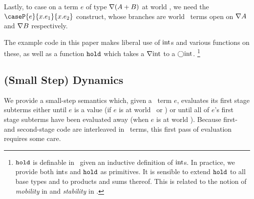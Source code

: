\begin{abstrsyn}
Lastly, to case on a term $e$ of type $\nabla(A+B)$ at world \bbonem, we need the
$\caseP{e}{x.e_1}{x.e_2}$ construct, whose branches are world \bbonem\ terms
open on $\nabla{A}$ and $\nabla{B}$ respectively.

The example code in this paper makes liberal use of ${\rm int}$s and various
functions on these, as well as a function ${\tt hold}$ which takes a $\nabla{\rm int}$
to a $\bigcirc{\rm int}$.%
\footnote{${\tt hold}$ is definable in \lang\ given an inductive definition of
${\rm int}$s. In practice, we provide both ${\rm int}$s and ${\tt hold}$ as primitives.
It is sensible to extend ${\tt hold}$ to all base types and to products and sums
thereof. This is related to the notion of {\em mobility} in \cite{murphy05} and
{\em stability} in \cite{krishnaswami13}.}

\end{abstrsyn}


\subsection{(Small Step) Dynamics}
We provide a small-step semantics which,
given a \lang\ term $e$, evaluates its first stage subterms
either until $e$ is a value (if $e$ is at world \bbonep\ or \bbonem)
or until all of $e$'s first stage subterms have been evaluated away
(when $e$ is at world \bbtwo).
Because first- and second-stage code are
interleaved in \lang\ terms, this first pass of
evaluation requires some care.

